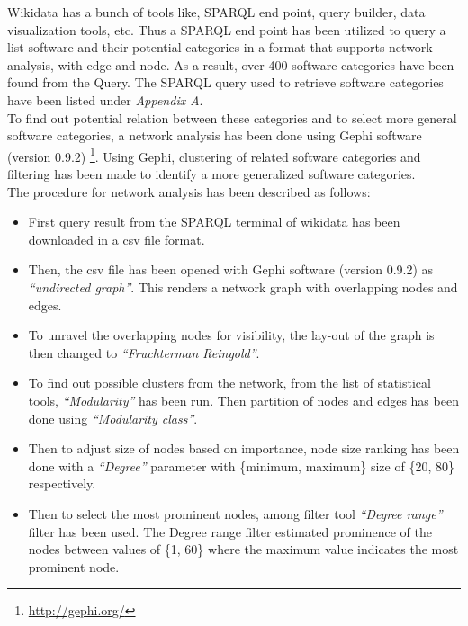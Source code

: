 Wikidata has a bunch of tools like, SPARQL end point, query builder, data visualization tools, etc. Thus a SPARQL end point has been utilized  to query a list software and their potential categories in a format that supports network analysis, with edge and node. As a result, over 400 software categories have been found from the Query. The SPARQL query used to retrieve software categories have been listed under \emph{Appendix A}.\\

To find out potential relation between these categories and to select more general software categories, a network analysis has been done using Gephi software (version 0.9.2) \footnote{\url{http://gephi.org/}}. Using Gephi, clustering of related software categories and filtering has been made to identify a more generalized software categories. \\

\noindent The procedure for network analysis has been described as follows:

\begin{itemize}
	\itemsep1em
	\item First query result from the SPARQL terminal of wikidata has been downloaded in a csv file format. 
	\item Then, the csv file has been opened with Gephi software (version 0.9.2) as \emph{“undirected graph”}. This renders a network graph with overlapping nodes and edges. 
	\item To unravel the overlapping nodes for visibility, the lay-out of the graph is then changed to \emph{“Fruchterman Reingold”}. 
	\item To find out possible clusters from the network, from the list of statistical tools, \emph{“Modularity”} has been run. Then partition of nodes and edges has been done using \emph{“Modularity class”}. 
	\item Then to adjust size of nodes based on importance, node size ranking has been done with a \emph{“Degree”} parameter with \{minimum, maximum\} size of  \{20, 80\} respectively. 
	\item Then to select the most prominent nodes, among filter tool \emph{“Degree range”} filter has been used. The Degree range filter estimated prominence of the nodes between values of \{1, 60\} where the maximum value indicates the most prominent node. 
\end{itemize}


